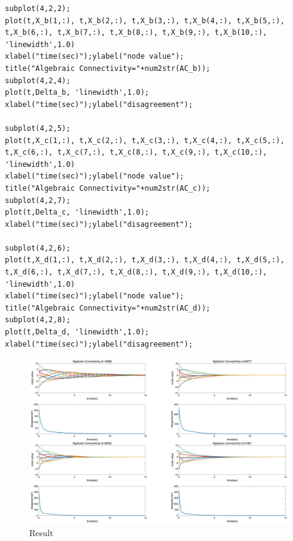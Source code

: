 \documentclass{article}
\begin{document}
\begin{lstlisting}
subplot(4,2,2);
plot(t,X_b(1,:), t,X_b(2,:), t,X_b(3,:), t,X_b(4,:), t,X_b(5,:), t,X_b(6,:), t,X_b(7,:), t,X_b(8,:), t,X_b(9,:), t,X_b(10,:), 'linewidth',1.0)
xlabel("time(sec)");ylabel("node value");
title("Algebraic Connectivity="+num2str(AC_b));
subplot(4,2,4);
plot(t,Delta_b, 'linewidth',1.0);
xlabel("time(sec)");ylabel("disagreement");

subplot(4,2,5);
plot(t,X_c(1,:), t,X_c(2,:), t,X_c(3,:), t,X_c(4,:), t,X_c(5,:), t,X_c(6,:), t,X_c(7,:), t,X_c(8,:), t,X_c(9,:), t,X_c(10,:), 'linewidth',1.0)
xlabel("time(sec)");ylabel("node value");
title("Algebraic Connectivity="+num2str(AC_c));
subplot(4,2,7);
plot(t,Delta_c, 'linewidth',1.0);
xlabel("time(sec)");ylabel("disagreement");

subplot(4,2,6);
plot(t,X_d(1,:), t,X_d(2,:), t,X_d(3,:), t,X_d(4,:), t,X_d(5,:), t,X_d(6,:), t,X_d(7,:), t,X_d(8,:), t,X_d(9,:), t,X_d(10,:), 'linewidth',1.0)
xlabel("time(sec)");ylabel("node value");
title("Algebraic Connectivity="+num2str(AC_d));
subplot(4,2,8);
plot(t,Delta_d, 'linewidth',1.0);
xlabel("time(sec)");ylabel("disagreement");
\end{lstlisting}

\begin{figure}[htbp]
    \centering
    \includegraphics[width=14.5cm]{figures/UserFig5.png}
    \caption{Result}
    \label{UserFig5}
\end{figure}
\end{document}
